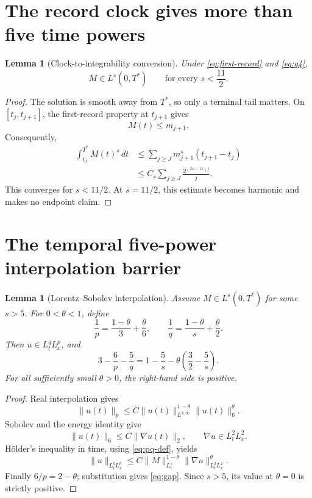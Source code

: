 \documentclass[11pt]{article}
\newtheorem{lemma}[theorem]{Lemma}
\theoremstyle{remark}
\begin{document}
\section{The record clock gives more than five time powers}

\begin{lemma}[Clock-to-integrability conversion]
\label{lem:clock}
Under \eqref{eq:first-record} and \eqref{eq:q4},
\[
 M\in L^s(0,T^*)
 \qquad\text{for every }s<\frac{11}{2}.
\]
\end{lemma}

\begin{proof}
The solution is smooth away from \(T^*\), so only a terminal tail matters.
On \([t_j,t_{j+1}]\), the first-record property at \(t_{j+1}\) gives
\[
 M(t)\le m_{j+1}.
\]
Consequently,
\[
\begin{aligned}
 \int_{t_J}^{T^*}M(t)^s\,dt
 &\le
 \sum_{j\ge J}
 m_{j+1}^s(t_{j+1}-t_j)\\
 &\le
 C_s\sum_{j\ge J}
 \frac{2^{(2s-11)j}}j.
\end{aligned}
\]
This converges for \(s<11/2\).  At \(s=11/2\), this estimate becomes
harmonic and makes no endpoint claim.
\end{proof}

\section{The temporal five-power interpolation barrier}

\begin{lemma}[Lorentz--Sobolev interpolation]
\label{lem:interpolation}
Assume \(M\in L^s(0,T^*)\) for some \(s>5\).  For \(0<\theta<1\), define
\begin{equation}
 \label{eq:pq-def}
 \frac1p=\frac{1-\theta}{3}+\frac{\theta}{6},
 \qquad
 \frac1q=\frac{1-\theta}{s}+\frac{\theta}{2}.
\end{equation}
Then \(u\in L^q_tL^p_x\), and
\begin{equation}
 \label{eq:gap}
 3-\frac6p-\frac5q
 =
 1-\frac5s
 -
 \theta\left(\frac32-\frac5s\right).
\end{equation}
For all sufficiently small \(\theta>0\), the right-hand side is positive.
\end{lemma}

\begin{proof}
Real interpolation gives
\[
 \|u(t)\|_p
 \le
 C
 \|u(t)\|_{L^{3,\infty}}^{1-\theta}
 \|u(t)\|_6^\theta.
\]
Sobolev and the energy identity give
\[
 \|u(t)\|_6\le C\|\nabla u(t)\|_2,
 \qquad
 \nabla u\in L^2_tL^2_x.
\]
H\"older's inequality in time, using \eqref{eq:pq-def}, yields
\[
 \|u\|_{L^q_tL^p_x}
 \le
 C
 \|M\|_{L^s_t}^{1-\theta}
 \|\nabla u\|_{L^2_tL^2_x}^{\theta}.
\]
Finally \(6/p=2-\theta\); substitution gives \eqref{eq:gap}.  Since
\(s>5\), its value at \(\theta=0\) is strictly positive.
\end{proof}
\end{document}
